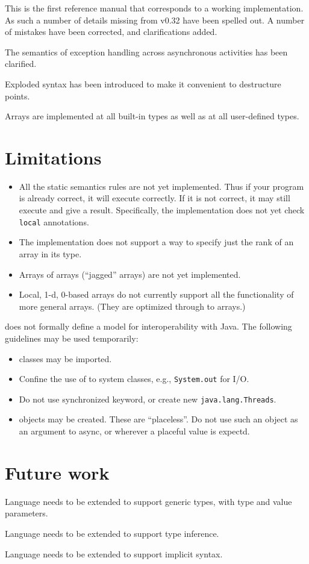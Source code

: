 
This is the first reference manual that corresponds to a working
implementation. As such a number of details missing from v0.32 have
been spelled out. A number of mistakes have been corrected, and
clarifications added.

The semantics of exception handling across asynchronous activities has
been clarified.

Exploded syntax has been introduced to make it convenient to
destructure points. 

Arrays are implemented at all built-in types as well as at all
user-defined types.

\section{Limitations}

\begin{itemize}
\item All the static semantics rules are not yet implemented. 
Thus if your program is already correct, it will execute correctly. If
it is not correct, it may still execute and give a
result. Specifically, the implementation does not yet check {\tt
local} annotations.

\item The implementation does not support a way to specify just the rank of
an array in its type.

\item Arrays of arrays (``jagged'' arrays) are not yet implemented.

\item Local, 1-d, 0-based arrays do not currently support all the
functionality of more general arrays. (They are optimized through to
\Java{} arrays.)

\end{itemize}

\XtenCurrVer{} does not formally define a model for interoperability with
Java. The following guidelines may be used temporarily:

\begin{itemize}
  \item \Java{} classes may be imported.
  \item Confine the use of \Java{} to system classes, e.g.,
{\tt  System.out} for I/O.
  \item Do not use synchronized keyword, or create new {\tt java.lang.Threads}. 
  \item \Java{} objects may be created. These are ``placeless''. Do not use
     such an object as an argument to async, or wherever a placeful
     value is expectd.
\end{itemize}

\section{Future work}

Language needs to be extended to support generic types, with
type and value parameters.

Language needs to be extended to support type inference.

Language needs to be extended to support implicit syntax.
